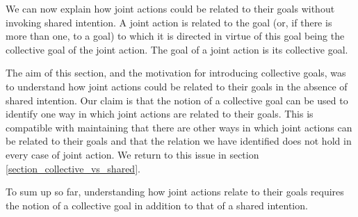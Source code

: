 \documentclass[12pt,a4paper]{extarticle}
\begin{document}
We can now explain how joint actions could be related to their goals without invoking shared intention.  A joint action is related to the goal (or, if there is more than one, to a goal) to which it is directed in virtue of this goal  being the collective goal of the joint action.  The goal of a joint action is its collective goal.

The aim of this section, and the motivation for introducing collective goals, was to understand how joint actions could be related to their goals in the absence of shared intention.  
Our claim is that the notion of a collective goal can be used to identify one way in which joint actions are related to their goals.  
This is compatible with maintaining that there are other ways in which joint actions can be related to their goals and that the relation we have identified does not hold in every case of joint action.  
We return to this issue in section \vref{section_collective_vs_shared}.

To sum up so far, understanding how joint actions relate to their goals requires the notion of a collective goal in addition to that of a shared intention.
\end{document}

